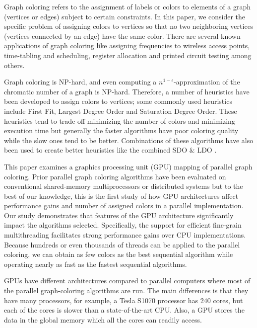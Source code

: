 \documentclass[preprint]{sigplanconf}
\begin{document}
Graph coloring refers to the assignment of labels or colors to elements of a graph (vertices or edges) subject to certain constraints. In this paper, we consider the specific problem of assigning colors to vertices so that no two neighboring vertices (vertices connected by an edge) have the same color. There are several known applications of graph coloring like assigning frequencies to wireless access points, time-tabling and scheduling, register allocation and printed circuit testing among others.

Graph coloring is NP-hard, and even computing a $n^{1-\epsilon}$-approximation of the chromatic number of a graph is NP-hard. Therefore, a number of heuristics have been developed to assign colors to vertices; some commonly used heuristics include First Fit, Largest Degree Order and Saturation Degree Order\cite{al2006new}.  These heuristics tend to trade off minimizing the number of colors and minimizing execution time but generally the faster algorithms have poor coloring quality while the slow ones tend to be better. Combinations of these algorithms have also been used to create better heuristics like the combined SDO $\&$ LDO \cite{al2006new}.

This paper examines a graphics processing unit (GPU) mapping of parallel graph coloring.  Prior parallel graph coloring algorithms have been evaluated on conventional shared-memory multiprocessors \cite{gebremedhin2000scalable} or distributed systems \cite{bozdag2008a} but to the best of our knowledge, this is the first study of how GPU architectures affect performance gains and number of assigned colors in a parallel implementation.  Our study demonstrates that features of the GPU architecture significantly impact the algorithms selected. Specifically, the support for efficient fine-grain multithreading facilitates strong performance gains over CPU implementations. Because hundreds or even thousands of threads can be applied to the parallel coloring, we can obtain as few colors as the best sequential algorithm while operating nearly as fast as the fastest sequential algorithms. 

GPUs have different architectures compared to parallel computers where most of the parallel graph-coloring algorithms are run. The main differences is that they have many processors, for example, a Tesla S1070 processor has 240 cores, but each of the cores is slower than a state-of-the-art CPU. Also, a GPU stores the data in the global memory which all the cores can readily access.
\end{document}
